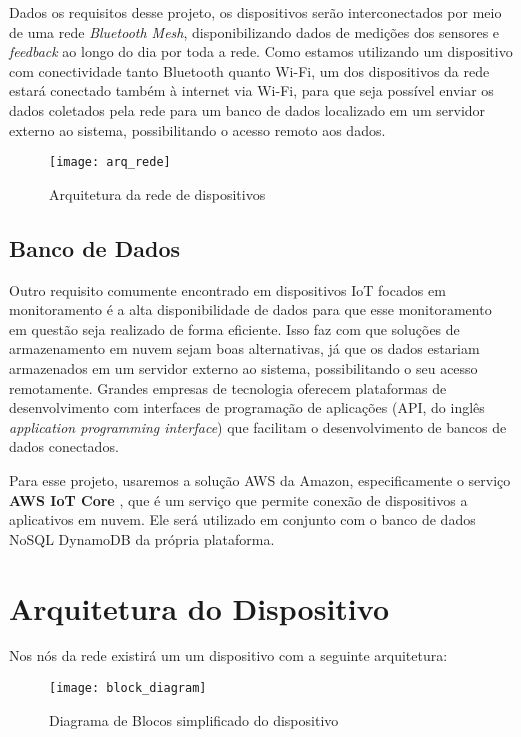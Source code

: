 \documentclass[../monografia.tex]{subfiles}
\begin{document}
Dados os requisitos desse projeto, os dispositivos serão interconectados por meio de uma rede \textit{Bluetooth Mesh}, disponibilizando dados de medições dos sensores e \textit{feedback} ao longo do dia por toda a rede. Como estamos utilizando um dispositivo com conectividade tanto Bluetooth quanto Wi-Fi, um dos dispositivos da rede estará conectado também à internet via Wi-Fi, para que seja possível enviar os dados coletados pela rede para um banco de dados localizado em um servidor externo ao sistema, possibilitando o acesso remoto aos dados.

\begin{figure}[h!]
    \texttt{[image: arq\_rede]}
    \caption{Arquitetura da rede de dispositivos}
    \label{fig:Diagrama de Blocos}
\end{figure}

\subsection{Banco de Dados}
Outro requisito comumente encontrado em dispositivos IoT focados em monitoramento é a alta disponibilidade de dados para que esse monitoramento em questão seja realizado de forma eficiente. Isso faz com que soluções de armazenamento em nuvem sejam boas alternativas, já que os dados estariam armazenados em um servidor externo ao sistema, possibilitando o seu acesso remotamente. Grandes empresas de tecnologia oferecem plataformas de desenvolvimento com interfaces de programação de aplicações (API, do inglês \textit{application programming interface}) que facilitam o desenvolvimento de bancos de dados conectados.

Para esse projeto, usaremos a solução AWS da Amazon, especificamente o serviço \textbf{AWS IoT Core} \cite{aws-iot}, que é um serviço que permite conexão de dispositivos a aplicativos em nuvem. Ele será utilizado em conjunto com o banco de dados NoSQL DynamoDB da própria plataforma.


\section{Arquitetura do Dispositivo} %
Nos nós da rede existirá um um dispositivo com a seguinte arquitetura:

\begin{figure}[h!]
    \centering
    \texttt{[image: block\_diagram]}
    \caption{Diagrama de Blocos simplificado do dispositivo}
    \label{fig:Diagrama de Blocos}
\end{figure}
\end{document}
